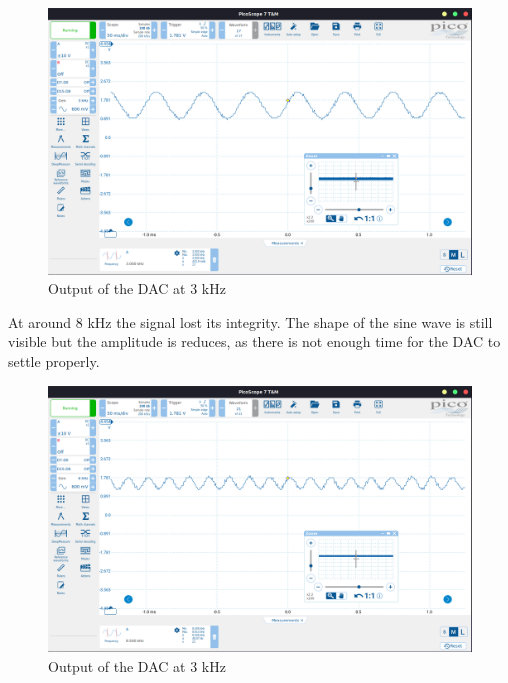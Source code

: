 \begin{figure}[H]
    \centering
    \includegraphics[width=150mm, keepaspectratio]{figures/upperlimit-good.png}
    \caption{Output of the DAC at 3 kHz}
    \label{fig:upperlimit-good}
\end{figure}

At around 8 kHz the signal lost its integrity. The shape of the sine wave is still visible but the amplitude is reduces, as there is not enough time for the DAC to settle properly.

\begin{figure}[H]
    \centering
    \includegraphics[width=150mm, keepaspectratio]{figures/upperlimit-bad.png}
    \caption{Output of the DAC at 3 kHz}
    \label{fig:upperlimit-bad}
\end{figure}
